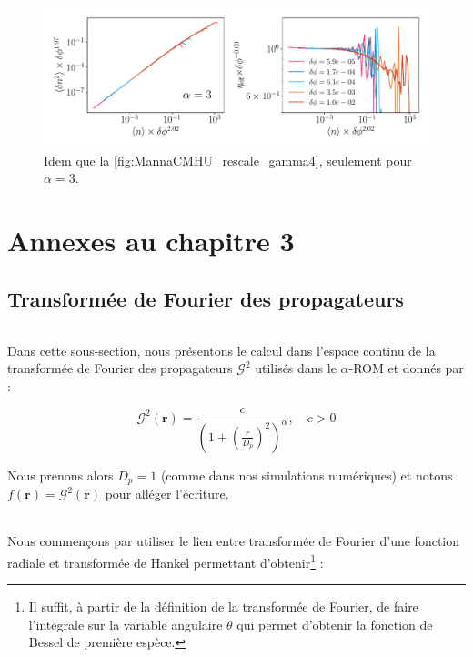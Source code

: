 \begin{figure}[H]
	\centering
	\includegraphics[width=\textwidth]{Chapitre2/Figures/Hyperuniformity/RescaleHU_MannaCM_Gamma3.pdf}
	\caption{Idem que la \autoref{fig:MannaCMHU_rescale_gamma4}, seulement pour $\alpha=3$.}
	\label{fig:MannaCMHU_rescale_gamma3}
\end{figure}

\FloatBarrier

\chapter{Annexes au chapitre 3}

\section{Transformée de Fourier des propagateurs}

\label{sec:TFinverse_susp}

\subparagraph{}Dans cette sous-section, nous présentons le calcul dans l'espace continu de la transformée de Fourier des propagateurs $\mathcal{G}^2$ utilisés dans le $\alpha$-ROM et donnés par :

\begin{equation}
	\mathcal{G}^2(\mathbf{r}) = \frac{c}{\left(1+\left(\frac{r}{D_p}\right)^2\right)^\alpha}, \quad c > 0
\end{equation}

\noindent Nous prenons alors $D_p = 1$ (comme dans nos simulations numériques) et notons $f(\mathbf{r}) = \mathcal{G}^2(\mathbf{r})$ pour alléger l'écriture.

\subparagraph{}Nous commençons par utiliser le lien entre transformée de Fourier d'une fonction radiale et transformée de Hankel \cite{poularikas_transforms_2018} permettant d'obtenir\footnote{Il suffit, à partir de la définition de la transformée de Fourier, de faire l'intégrale sur la variable angulaire $\theta$ qui permet d'obtenir la fonction de Bessel de première espèce.} :

